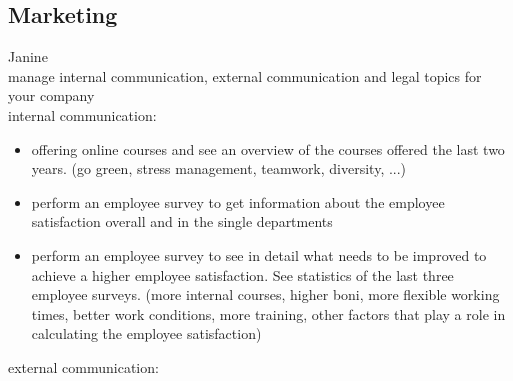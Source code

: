 \documentclass[11pt,titlepage,oneside,openany]{book}
\begin{document}
\subsection{Marketing}
Janine\\
manage internal communication, external communication and legal topics for your company 
\\
internal communication: 
\begin{itemize} 
\item offering online courses and see an overview of the courses offered the last two years. (go green, stress management, teamwork, diversity, ...) 
\item perform an employee survey to get information about the employee satisfaction overall and in the single departments
\item perform an employee survey to see in detail what needs to be improved to achieve a higher employee satisfaction. See statistics of the last three employee surveys. (more internal courses, higher boni, more flexible working times, better work conditions, more training, other factors that play a role in calculating the employee satisfaction)   
\end{itemize}
external communication: 
\end{document}
